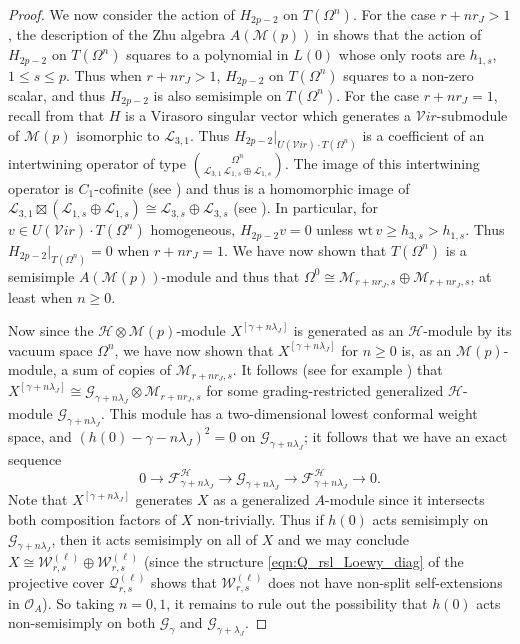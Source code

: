 \documentclass[11pt, reqno]{amsart}
\theoremstyle{definition}\newtheorem{defi}[thm]{Definition}
\theoremstyle{definition}\newtheorem{rem}[thm]{Remark}
\theoremstyle{definition}\newtheorem{exam}[thm]{Example}
\theoremstyle{definition}\newtheorem{assum}[thm]{Assumption}
\newcommand{\cH}{\mathcal{H}}
\newcommand{\cV}{\mathcal{V}}
\newcommand{\cM}{\mathcal{M}}
\newcommand{\cF}{\mathcal{F}}
\newcommand{\cL}{\mathcal{L}}
\newcommand{\cO}{\mathcal{O}}
\newcommand{\cG}{\mathcal{G}}
\newcommand{\cW}{\mathcal{W}}
\newcommand{\cQ}{\mathcal{Q}}
\newcommand{\tens}{\boxtimes}
\begin{document}
\begin{proof}
We now consider the action of $H_{2p-2}$ on $T(\Omega^n)$. For the case $r+nr_J>1$, the description of the Zhu algebra $A(\cM(p))$ in \cite{Ad} shows that the action of $H_{2p-2}$ on $T(\Omega^n)$ squares to a polynomial in $L(0)$ whose only roots are $h_{1,s}$, $1\leq s\leq p$. Thus when $r+nr_J>1$, $H_{2p-2}$ on $T(\Omega^n)$ squares to a non-zero scalar, and thus $H_{2p-2}$ is also semisimple on $T(\Omega^n)$. For the case $r+nr_J=1$, recall from \cite{Ad} that $H$ is a Virasoro singular vector which generates a $\cV ir$-submodule of $\cM(p)$ isomorphic to $\cL_{3,1}$. Thus $H_{2p-2}\vert_{U(\cV ir)\cdot T(\Omega^n)}$ is a coefficient of an intertwining operator of type $\binom{\Omega^n}{\cL_{3,1}\,\cL_{1,s}\oplus\cL_{1,s}}$. The image of this intertwining operator is $C_1$-cofinite (see \cite[Key Theorem]{Miy}) and thus is a homomorphic image of $\cL_{3,1}\tens(\cL_{1,s}\oplus\cL_{1,s})\cong\cL_{3,s}\oplus\cL_{3,s}$ (see \cite[Theorem 4.6]{MY}). In particular, for $v\in U(\cV ir)\cdot T(\Omega^n)$ homogeneous, $H_{2p-2} v=0$ unless $\mathrm{wt}\,v\geq h_{3,s}> h_{1,s}$. Thus $H_{2p-2}\vert_{T(\Omega^n)}=0$ when $r+nr_J=1$. We have now shown that $T(\Omega^n)$ is a semisimple $A(\cM(p))$-module and thus that $\Omega^0\cong\cM_{r+nr_J,s}\oplus\cM_{r+nr_J,s}$, at least when $n\geq 0$.

Now since the $\cH\otimes\cM(p)$-module $X^{[\gamma+n\lambda_J]}$ is generated as an $\cH$-module by its vacuum space $\Omega^n$, we have now shown that $X^{[\gamma+n\lambda_J]}$ for $n\geq 0$ is, as an $\cM(p)$-module, a sum of copies of $\cM_{r+nr_J,s}$. It follows (see for example \cite[Theorem 2.7]{McR-cosets}) that $X^{[\gamma+n\lambda_J]}\cong \cG_{\gamma+n\lambda_J}\otimes\cM_{r+nr_J,s}$ for some grading-restricted generalized $\cH$-module $\cG_{\gamma+n\lambda_J}$. This module has a two-dimensional lowest conformal weight space, and $(h(0)-\gamma-n\lambda_J)^2=0$ on $\cG_{\gamma+n\lambda_J}$; it follows that we have an exact sequence
\begin{equation*}
0\longrightarrow \cF^\cH_{\gamma+n\lambda_J}\longrightarrow\cG_{\gamma+n\lambda_J}\longrightarrow\cF^\cH_{\gamma+n\lambda_J}\longrightarrow 0.
\end{equation*}
Note that $X^{[\gamma+n\lambda_J]}$ generates $X$ as a generalized $A$-module since it intersects both composition factors of $X$ non-trivially. Thus if $h(0)$ acts semisimply on $\cG_{\gamma+n\lambda_J}$, then it acts semisimply on all of $X$ and we may conclude $X\cong\cW_{r,s}^{(\ell)}\oplus\cW_{r,s}^{(\ell)}$ (since the structure \eqref{eqn:Q_rsl_Loewy_diag} of the projective cover $\cQ_{r,s}^{(\ell)}$ shows that $\cW_{r,s}^{(\ell)}$ does not have non-split self-extensions in $\cO_A$). So taking $n=0,1$, it remains to rule out the possibility that $h(0)$ acts non-semisimply on both $\cG_\gamma$ and $\cG_{\gamma+\lambda_J}$.


\end{proof}
\end{document}
